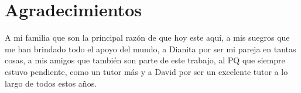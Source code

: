 \chapter*{Agradecimientos}\label{chapter:thanks}

A mi familia que son la principal razón de que hoy este aquí, a mis suegros que me han brindado todo el apoyo del mundo, a Dianita por ser mi pareja en tantas cosas, a mis amigos que también son parte de este trabajo, al PQ que siempre estuvo pendiente, como un tutor más y a David por ser un excelente tutor a lo largo de todos estos años.
